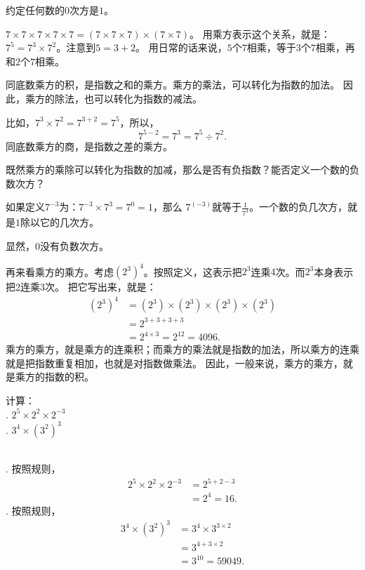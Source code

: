 \documentclass[12pt,UTF8,fontset=none]{ctexbook}
\begin{document}
约定任何数的$0$次方是$1$。

$7\times 7\times 7\times 7\times 7 = (7\times 7\times 7)\times (7\times 7)$。
用乘方表示这个关系，就是：$7^5 = 7^3 \times 7^2$。注意到$5 = 3 + 2$。
用日常的话来说，$5$个$7$相乘，等于$3$个$7$相乘，再和$2$个$7$相乘。

同底数乘方的积，是指数之和的乘方。乘方的乘法，可以转化为指数的加法。
因此，乘方的除法，也可以转化为指数的减法。

比如，$7^3 \times 7^2 = 7^{3+2} = 7^5$，所以，
$$7^{5-2} = 7^3 = 7^5 \div 7^2.$$
同底数乘方的商，是指数之差的乘方。

既然乘方的乘除可以转化为指数的加减，那么是否有负指数？能否定义一个数的负数次方？

如果定义$7^{-3}$为：$7^{-3} \times 7^3 = 7^{0} = 1$，那么
$7^{(-3)}$就等于$\frac{1}{7^3}$。一个数的负几次方，就是$1$除以它的几次方。

显然，$0$没有负数次方。

再来看乘方的乘方。考虑$\left(2^3\right)^4$。按照定义，这表示把$2^3$连乘$4$次。而$2^3$本身表示把$2$连乘$3$次。
把它写出来，就是：
\begin{align*}
    \left(2^3\right)^4 &= \left(2^3\right) \times \left(2^3\right) \times \left(2^3\right) \times \left(2^3\right) \\
    &= 2^{3+3+3+3} \\
    &= 2^{4\times 3} = 2^{12} = 4096.
\end{align*}
乘方的乘方，就是乘方的连乘积；而乘方的乘法就是指数的加法，所以乘方的连乘就是把指数重复相加，也就是对指数做乘法。
因此，一般来说，乘方的乘方，就是乘方的指数的积。

\begin{et}
    计算：\\
    . $2^{5} \times 2^2 \times 2^{-3}$ \\
    . $3^4 \times \left(3^2\right)^3$ 

\end{et}

\begin{so}
    \mbox{} \\
    . 按照规则，
    \begin{align*}
        2^{5} \times 2^2 \times 2^{-3} &= 2^{5+2-3} \\
        &= 2^4 = 16.
    \end{align*}
    . 按照规则，
    \begin{align*}
        3^4 \times \left(3^2\right)^3 &= 3^4 \times 3^{3\times 2} \\
        &= 3^{4 + 3\times 2}  \\
        &= 3^10 = 59049.
    \end{align*}
\end{so}
\end{document}
